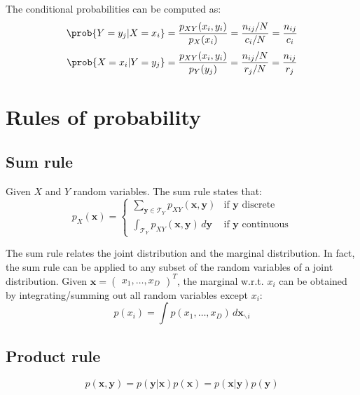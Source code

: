 \begin{description}
\begin{example}
            The conditional probabilities can be computed as:
            \[ \prob{Y = y_j \vert X = x_i} = \frac{p_{XY}(x_i, y_i)}{p_X(x_i)} = \frac{n_{ij}/N}{c_i/N} = \frac{n_{ij}}{c_i} \]
            \[ \prob{X = x_i \vert Y = y_j} = \frac{p_{XY}(x_i, y_i)}{p_Y(y_j)} = \frac{n_{ij}/N}{r_j/N} = \frac{n_{ij}}{r_j} \]
        \end{example}
\end{description}



\section{Rules of probability}

\subsection{Sum rule}
Given $X$ and $Y$ random variables. The sum rule states that:
\[
    p_X(\bm{x}) =
    \begin{cases}
        \sum_{\bm{y} \in \mathcal{T}_Y} p_{XY}(\bm{x}, \bm{y}) & \text{if } \bm{y} \text{ discrete} \\
        \int_{\mathcal{T}_Y} p_{XY}(\bm{x}, \bm{y}) \,d\bm{y} & \text{if } \bm{y} \text{ continuous}
    \end{cases}
\]

The sum rule relates the joint distribution and the marginal distribution.
In fact, the sum rule can be applied to any subset of the random variables of a joint distribution.
Given $\bm{x} = \begin{pmatrix} x_1, \dots, x_D \end{pmatrix}^T$, 
the marginal w.r.t. $x_i$ can be obtained by integrating/summing out all random variables except $x_i$:
\[ p(x_i) = \int p(x_1, \dots, x_D) \,d\bm{x}_{\smallsetminus i} \]

\subsection{Product rule}
\[ p(\bm{x}, \bm{y}) = p(\bm{y} \vert \bm{x}) p(\bm{x}) = p(\bm{x} \vert \bm{y}) p(\bm{y}) \]



